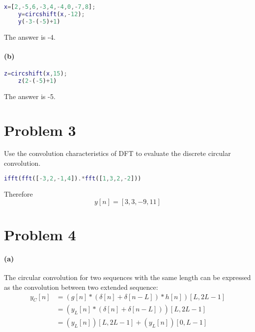 \documentclass{article}
\begin{document}
\begin{lstlisting}[language=matlab,style=matlab]
    x=[2,-5,6,-3,4,-4,0,-7,8];
    y=circshift(x,-12);
    y(-3-(-5)+1)
\end{lstlisting}

The answer is -4.

\paragraph{(b)}

\begin{lstlisting}[language=matlab,style=matlab]
    z=circshift(x,15);
    z(2-(-5)+1)
\end{lstlisting}

The answer is -5.

\section{Problem 3}

Use the convolution characteristics of DFT to evaluate the discrete circular convolution.

\begin{lstlisting}[language=matlab,style=matlab]
    ifft(fft([-3,2,-1,4]).*fft([1,3,2,-2]))
\end{lstlisting}

Therefore
\begin{equation}
	y[n]=[3,3,-9,11]
\end{equation}

\section{Problem 4}
\paragraph{(a)}

The circular convolution for two sequences with the same length can be expressed as the convolution between two extended sequence:
\begin{equation}
	\begin{aligned}
		y_{C}[n] & =(g[n]*(\delta[n]+\delta[n-L])*h[n])[L,2L-1] \\
		         & =(y_{L}[n]*(\delta[n]+\delta[n-L]))[L,2L-1]  \\
		         & =(y_{L}[n])[L,2L-1]+(y_{L}[n])[0,L-1]
	\end{aligned}
\end{equation}
\end{document}
